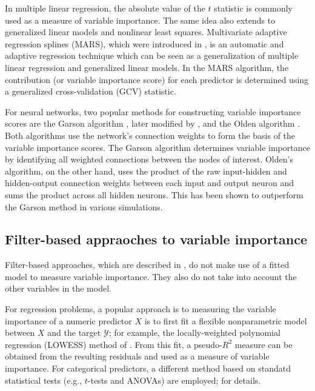\documentclass[12pt]{article}
\begin{document}
In multiple linear regression, the absolute value of the $t$ statistic is commonly used as a measure of variable importance. The same idea also extends to generalized linear models and nonlinear least squares. Multivariate adaptive regression splines (MARS), which were introduced in \citet{friedman-1991-mars}, is an automatic and adaptive regression technique which can be seen as a generalization of multiple linear regression and generalized linear models. In the MARS algorithm, the contribution (or variable importance score) for each predictor is determined using a generalized cross-validation (GCV) statistic.

For neural networks, two popular methods for constructing variable importance scores are the Garson algorithm \citep{interpreting-garson-1991}, later modified by \citet{back-goh-1995}, and the Olden algorithm \citep{accurate-olden-2004}. Both algorithms use the network's connection weights to form the basis of the variable importance scores. The Garson algorithm determines variable importance by identifying all weighted connections between the nodes of interest. Olden's algorithm, on the other hand, uses the product of the raw input-hidden and hidden-output connection weights between each input and output neuron and sums the product across all hidden neurons. This has been shown to outperform the Garson method in various simulations.


\subsection{Filter-based appraoches to variable importance}

Filter-based approaches, which are described in \citet[chap. 18]{applied-kuhn-2013}, do not make use of a fitted model to measure variable importance. They also do not take into account the other variables in the model.

For regression problems, a popular approach is to measuring the variable importance of a numeric predictor $X$ is to first fit a flexible nonparametric model between $X$ and the target $\mathcal{Y}$; for example, the locally-weighted polynomial regression (LOWESS) method of \citet{robust-cleveland-1979}. From this fit, a pseudo-$R^2$ measure can be obtained from the resulting residuals and used as a measure of variable importance. For categorical predictors, a different method based on standatd statistical tests (e.g., $t$-tests and ANOVAs) are employed; \citet[chap. 18]{applied-kuhn-2013} for details.
\end{document}

